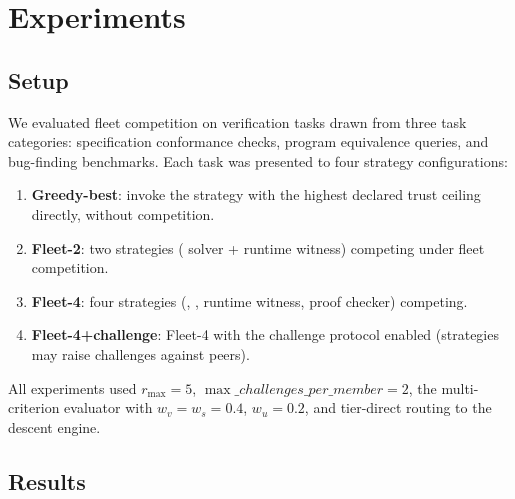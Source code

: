 \documentclass[11pt]{article}
\begin{document}
\section{Experiments}\label{sec:experiments}

\subsection{Setup}

We evaluated fleet competition on \numcases{} verification tasks drawn from
three task categories: \numspec{} specification conformance checks,
\numeq{} program equivalence queries, and \numbug{} bug-finding benchmarks.
Each task was presented to four strategy configurations:

\begin{enumerate}[label=(\arabic*)]
  \item \textbf{Greedy-best}: invoke the strategy with the highest declared
    trust ceiling directly, without competition.
  \item \textbf{Fleet-2}: two strategies (\QFLIA{} solver + runtime witness)
    competing under fleet competition.
  \item \textbf{Fleet-4}: four strategies (\QFLIA{}, \QFLRA{}, runtime
    witness, \LEAN{} proof checker) competing.
  \item \textbf{Fleet-4+challenge}: Fleet-4 with the challenge protocol
    enabled (strategies may raise challenges against peers).
\end{enumerate}

All experiments used $r_{\max} = 5$, $\max\_challenges\_per\_member = 2$,
the multi-criterion evaluator with $w_v = w_s = 0.4$, $w_u = 0.2$, and
tier-direct routing to the descent engine.

\subsection{Results}
\end{document}
